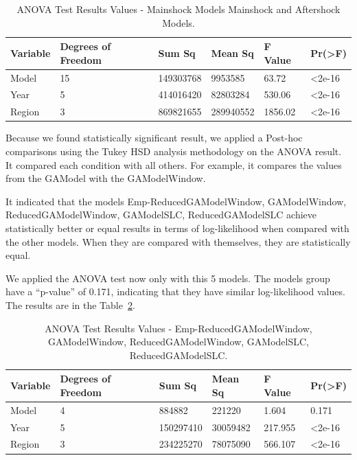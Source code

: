 \begin{table}[]
	\centering
	\begin{tabular}{|l|l|l|l|l|l|}
		\hline
		{Variable} & {Degrees of Freedom} & {Sum Sq}    & {Mean Sq}   & {F Value} & {Pr(\textgreater F)} \\
		\hline
		Model    & 15           	  & 149303768  & 9953585   & 63.72    & \textless2e-16     \\
		\hline
		Year     & 5                  & 414016420  & 82803284  & 530.06   & \textless2e-16     \\
		\hline
		Region   & 3                  & 869821655  & 289940552  & 1856.02   & \textless2e-16	\\    
		\hline
	\end{tabular}
	\caption{ANOVA Test Results Values - Mainshock Models Mainshock and Aftershock Models.}
	\label{anovatest1}
\end{table}

Because we found statistically significant result, we applied a Post-hoc comparisons using the Tukey HSD analysis methodology on the ANOVA result. It compared each condition with all others. For example, it compares the values from the GAModel with the GAModelWindow. 

It indicated that the models Emp-ReducedGAModelWindow, GAModelWindow, ReducedGAModelWindow, GAModelSLC, ReducedGAModelSLC achieve statistically better or equal results in terms of log-likelihood when compared with the other models. When they are compared with themselves, they are statistically equal. 

We applied the ANOVA test now only with this 5 models. The models group have a ``p-value'' of 0.171, indicating that they have similar log-likelihood values. The results are in the Table~\ref{anovatest2}.
     
\begin{table}[!htb]
	\centering
	\begin{tabular}{|l|l|l|l|l|l|}
		\hline
		{Variable} & {Degrees of Freedom} & {Sum Sq}    & {Mean Sq}   & {F Value} & {Pr(\textgreater F)} \\
		\hline
		Model    & 4           	  & 884882  & 221220   & 1.604    & 0.171    \\
		\hline
		Year     & 5                 & 150297410  & 30059482  & 217.955   & \textless2e-16     \\
		\hline
		Region   & 3                  & 234225270  & 78075090  & 566.107   & \textless2e-16	\\    
		\hline
	\end{tabular}
	\caption{ANOVA Test Results Values - Emp-ReducedGAModelWindow, GAModelWindow, ReducedGAModelWindow, GAModelSLC, ReducedGAModelSLC.}
	\label{anovatest2}
\end{table}

